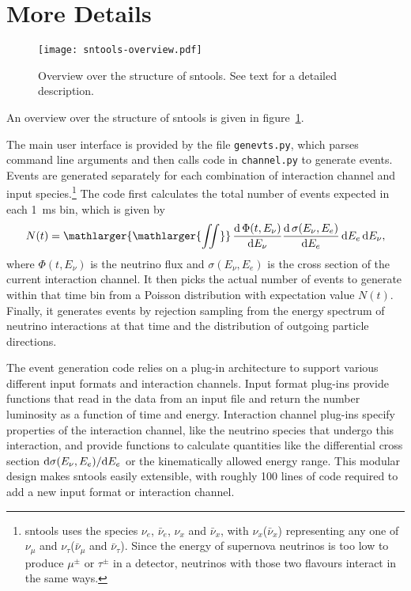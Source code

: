 \documentclass[11pt, oneside]{article}
\renewcommand{\d}{\mathrm{d}}
\newcommand{\tdiff}[3][\empty]{\ifx\empty#1
		\frac{\d\,#2}{\d #3}
	\else
		\frac{\d^{#1}\,#2}{\d #3^{#1}}
	\fi} %
\newcommand{\tdiffx}[3][\empty]{\ifx\empty#1
		\d #2 / \d #3
	\else
		\d^{#1} #2 / \d #3^{#1}
	\fi} %
\newcommand{\nue}{\ensuremath{\nu_e}\xspace}
\newcommand{\numu}{\ensuremath{\nu_\mu}\xspace}
\newcommand{\nutau}{\ensuremath{\nu_\tau}\xspace}
\newcommand{\nux}{\ensuremath{\nu_x}\xspace}
\newcommand{\nuebar}{\ensuremath{\bar{\nu}_e}\xspace}
\newcommand{\numubar}{\ensuremath{\bar{\nu}_\mu}\xspace}
\newcommand{\nutaubar}{\ensuremath{\bar{\nu}_\tau}\xspace}
\newcommand{\nuxbar}{\ensuremath{\bar{\nu}_x}\xspace}
\begin{document}
\section{More Details}

\begin{figure}[htbp]
	\centering
	\texttt{[image: sntools-overview.pdf]}
	\caption[Overview over the structure of sntools]{Overview over the structure of sntools. See text for a detailed description.}
	\label{fig-sim-sntools-overview}
\end{figure}

An overview over the structure of sntools is given in figure~\ref{fig-sim-sntools-overview}.

The main user interface is provided by the file \texttt{genevts.py}, which parses command line arguments and then calls code in \texttt{channel.py} to generate events.
Events are generated separately for each combination of interaction channel and input species.\footnote{sntools uses the species \nue, \nuebar, \nux and \nuxbar, with \nux (\nuxbar) representing any one of \numu and \nutau (\numubar and \nutaubar). Since the energy of supernova neutrinos is too low to produce $\mu^\pm$ or $\tau^\pm$ in a detector, neutrinos with those two flavours interact in the same ways.}
The code first calculates the total number of events expected in each \SI{1}{ms} bin, which is given by
\begin{equation}
N(t) = \mathop{\mathlarger{\mathlarger{\iint}}} \tdiff{\Phi (t, E_\nu)}{E_\nu} \tdiff{\sigma (E_\nu, E_e)}{E_e}\, \d E_e\,\d E_\nu,
\end{equation}
where $\Phi (t, E_\nu)$ is the neutrino flux and $\sigma (E_\nu, E_e)$ is the cross section of the current interaction channel.
It then picks the actual number of events to generate within that time bin from a Poisson distribution with expectation value $N(t)$.
Finally, it generates events by rejection sampling from the energy spectrum of neutrino interactions at that time and the distribution of outgoing particle directions.

The event generation code relies on a plug-in architecture to support various different input formats and interaction channels.
Input format plug-ins provide functions that read in the data from an input file and return the number luminosity as a function of time and energy.
Interaction channel plug-ins specify properties of the interaction channel, like the neutrino species that undergo this interaction, and provide functions to calculate quantities like the differential cross section $\tdiffx{\sigma (E_\nu, E_e)}{E_e}$ or the kinematically allowed energy range.
This modular design makes sntools easily extensible, with roughly 100 lines of code required to add a new input format or interaction channel.
\end{document}

